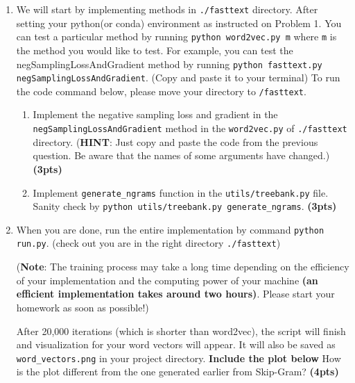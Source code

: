 \documentclass{assignment format}
\begin{document}
\begin{enumerate}[label=(\alph*)]
    \item We will start by implementing methods in \texttt{./fasttext} directory. After setting your python(or conda) environment as instructed on Problem 1. You can test a particular method by running \texttt{python word2vec.py m} where \texttt{m} is the method you would like to test. For example, you can test the negSamplingLossAndGradient method by running \texttt{python fasttext.py negSamplingLossAndGradient}. (Copy and paste it to your terminal)
    \newline
    To run the code command below, please move your directory to \texttt{/fasttext}.
        \begin{enumerate}[label=(\roman*)]
        \item Implement the negative sampling loss and gradient in the \texttt{negSamplingLossAndGradient} method in the \texttt{word2vec.py} of \texttt{./fasttext} directory. (\textbf{HINT}: Just copy and paste the code from the previous question. Be aware that the names of some arguments have changed.) \textbf{(3pts)}
        \item Implement \texttt{generate\_ngrams} function in the \texttt{utils/treebank.py} file. Sanity check by \texttt{python utils/treebank.py generate\_ngrams}. \textbf{(3pts)}
    \end{enumerate}
    \item When you are done, run the entire implementation by command \texttt{python run.py}. (check out you are in the right directory \texttt{./fasttext})

    (\textbf{Note}: The training process may take a long time depending on the efficiency of your implementation and the computing power of your machine \textbf{(an efficient implementation takes around two hours)}. Please start your homework as soon as possible!)

    After 20,000 iterations (which is shorter than word2vec), the script will finish and visualization for your word vectors will appear. It will also be saved as \texttt{word\_vectors.png} in your project directory. \textbf{Include the plot below} How is the plot different from the one generated earlier from Skip-Gram? \textbf{(4pts)}
    

\end{enumerate}
\end{document}
